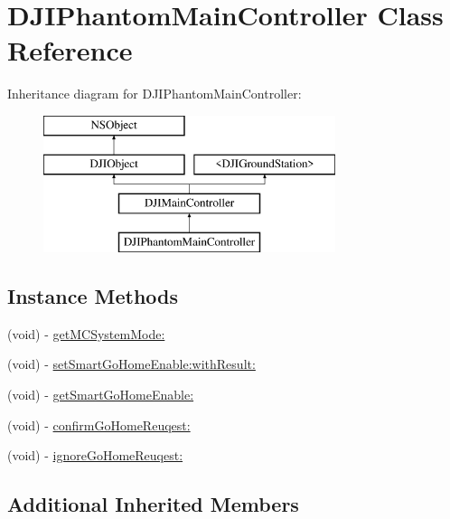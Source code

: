 \hypertarget{interface_d_j_i_phantom_main_controller}{\section{D\+J\+I\+Phantom\+Main\+Controller Class Reference}
\label{interface_d_j_i_phantom_main_controller}
}
Inheritance diagram for D\+J\+I\+Phantom\+Main\+Controller\+:\begin{figure}[H]
\begin{center}
\leavevmode
\includegraphics[height=4.000000cm]{interface_d_j_i_phantom_main_controller}
\end{center}
\end{figure}
\subsection*{Instance Methods}
\begin{DoxyCompactItemize}
\item 
(void) -\/ \hyperlink{interface_d_j_i_phantom_main_controller_ab0cb06ebdfd70108ca5e0835137007ac}{get\+M\+C\+System\+Mode\+:}
\item 
(void) -\/ \hyperlink{interface_d_j_i_phantom_main_controller_a051413e716f7d0540bfed22e35ad5686}{set\+Smart\+Go\+Home\+Enable\+:with\+Result\+:}
\item 
(void) -\/ \hyperlink{interface_d_j_i_phantom_main_controller_a6532d0d30d987cb5abfb710dbc7bf94c}{get\+Smart\+Go\+Home\+Enable\+:}
\item 
(void) -\/ \hyperlink{interface_d_j_i_phantom_main_controller_a4ac75d4b4381430bc9ff55d8a8466b2b}{confirm\+Go\+Home\+Reuqest\+:}
\item 
(void) -\/ \hyperlink{interface_d_j_i_phantom_main_controller_ae1edbf81ec14bc6e89420b0b6139e7ba}{ignore\+Go\+Home\+Reuqest\+:}
\end{DoxyCompactItemize}
\subsection*{Additional Inherited Members}


